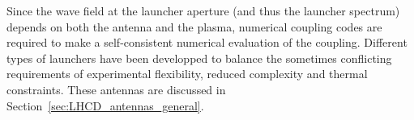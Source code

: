 Since the wave field at the launcher aperture (and thus the launcher spectrum) depends on both the antenna and the plasma, numerical coupling codes are required to make a self-consistent numerical evaluation of the coupling. Different types of launchers have been developped to balance the sometimes conflicting requirements of experimental flexibility, reduced complexity and thermal constraints. These antennas are discussed in Section~\ref{sec:LHCD_antennas_general}.


%
%
%
%
%
%
